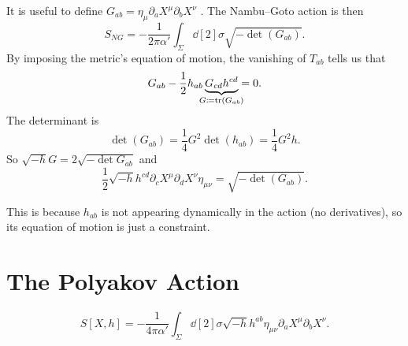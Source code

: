 It is useful to define  $G_{ab} = \eta_{\mu} \partial_{a} X^{\mu} \partial_{b} X^{\nu}$ . The Nambu--Goto action is then
\begin{equation}
  S_{NG} = -\frac{1}{2\pi \alpha'} \int_\Sigma \dd[2]{\sigma} \sqrt{- \det (G_{ab})}.
\end{equation}
By imposing the metric's equation of motion, the vanishing of $T_{ab}$  tells us that
\begin{equation}
  G_{ab} - \frac{1}{2} h_{ab} \underbrace{G_{cd} h^{cd}}_{\mathclap{G \coloneqq \tr(G_{ab})}} = 0.
\end{equation}
The determinant is
\begin{equation}
  \det(G_{ab}) = \frac{1}{4} G^2 \det(h_{ab}) = \frac{1}{4}G^2 h.
\end{equation}
So $\sqrt{-h} G = 2 \sqrt{-\det G_{ab}}$  and
\begin{equation}
  \frac{1}{2} \sqrt{-h} h^{cd} \partial_{c} X^{\mu} \partial_{d} X^{\nu} \eta_{\mu\nu} = \sqrt{-\det(G_{ab})}.
\end{equation}

\begin{remark}
  This is because $h_{ab}$ is not appearing dynamically in the action (no derivatives), so its equation of motion is just a constraint.
\end{remark}

\section{The Polyakov Action}%
\label{sec:the_polyakov_action}

\begin{equation*}
  S[X, h] = -\frac{1}{4 \pi \alpha'} \int_{\Sigma} \dd[2]{\sigma} \sqrt{-h} h^{ab} \eta_{\mu\nu} \partial_{a} X^{\mu} \partial_{b} X^{\nu}.
\end{equation*}


